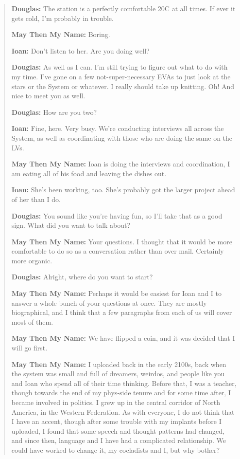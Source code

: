 \begin{quote}
\textbf{Douglas:} The station is a perfectly comfortable 20C at all times. If ever it gets cold, I'm probably in trouble.

\textbf{May Then My Name:} Boring.

\textbf{Ioan:} Don't listen to her. Are you doing well?

\textbf{Douglas:} As well as I can. I'm still trying to figure out what to do with my time. I've gone on a few not-super-necessary EVAs to just look at the stars or the System or whatever. I really should take up knitting. Oh! And nice to meet you as well.

\textbf{Douglas:} How are you two?

\textbf{Ioan:} Fine, here. Very busy. We're conducting interviews all across the System, as well as coordinating with those who are doing the same on the LVs.

\textbf{May Then My Name:} Ioan is doing the interviews and coordination, I am eating all of his food and leaving the dishes out.

\textbf{Ioan:} She's been working, too. She's probably got the larger project ahead of her than I do.

\textbf{Douglas:} You sound like you're having fun, so I'll take that as a good sign. What did you want to talk about?

\textbf{May Then My Name:} Your questions. I thought that it would be more comfortable to do so as a conversation rather than over mail. Certainly more organic.

\textbf{Douglas:} Alright, where do you want to start?

\textbf{May Then My Name:} Perhaps it would be easiest for Ioan and I to answer a whole bunch of your questions at once. They are mostly biographical, and I think that a few paragraphs from each of us will cover most of them.

\textbf{May Then My Name:} We have flipped a coin, and it was decided that I will go first.

\textbf{May Then My Name:} I uploaded back in the early 2100s, back when the system was small and full of dreamers, weirdos, and people like you and Ioan who spend all of their time thinking. Before that, I was a teacher, though towards the end of my phys-side tenure and for some time after, I became involved in politics. I grew up in the central corridor of North America, in the Western Federation. As with everyone, I do not think that I have an accent, though after some trouble with my implants before I uploaded, I found that some speech and thought patterns had changed, and since then, language and I have had a complicated relationship. We could have worked to change it, my cocladists and I, but why bother?


\end{quote}
